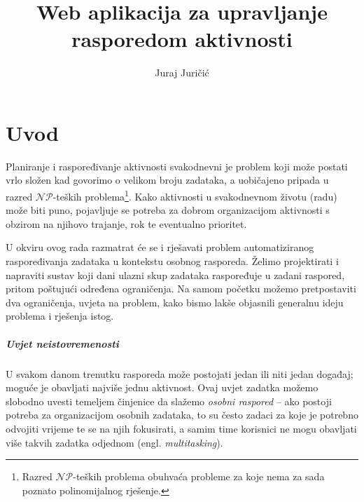\documentclass[times, utf8, zavrsni]{fer}
\begin{document}
\nocite{*}


\title{Web aplikacija za upravljanje rasporedom aktivnosti}

\author{Juraj Juričić}

\maketitle



\zahvala{}

\tableofcontents

\chapter{Uvod}\label{uvod}
Planiranje i raspoređivanje aktivnosti svakodnevni je problem koji može postati vrlo složen kad govorimo o velikom broju zadataka, a uobičajeno pripada u razred $\mathcal{NP}$-teških problema\footnote{Razred $\mathcal{NP}$-teških problema obuhvaća probleme za koje nema za sada poznato polinomijalnog rješenje.}. Kako aktivnosti u svakodnevnom životu (radu) može biti puno, pojavljuje se potreba za dobrom organizacijom aktivnosti s obzirom na njihovo trajanje, rok te eventualno prioritet.

U okviru ovog rada razmatrat će se i rješavati problem automatiziranog raspoređivanja zadataka u kontekstu osobnog rasporeda. Želimo projektirati i napraviti sustav koji dani ulazni skup zadataka raspoređuje u zadani raspored, pritom poštujući određena ograničenja. Na samom početku možemo pretpostaviti dva ograničenja, uvjeta na problem, kako bismo lakše objasnili generalnu ideju problema i rješenja istog.

\paragraph{Uvjet neistovremenosti} U svakom danom trenutku rasporeda može postojati jedan ili niti jedan događaj; moguće je obavljati najviše jednu aktivnost. Ovaj uvjet zadatka možemo slobodno uvesti temeljem činjenice da slažemo \textit{osobni raspored} -- ako postoji potreba za organizacijom osobnih zadataka, to su često zadaci za koje je potrebno odvojiti vrijeme te se na njih fokusirati, a samim time korisnici ne mogu obavljati više takvih zadatka odjednom (engl. \textit{multitasking}).
\end{document}
